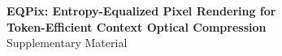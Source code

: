 \documentclass[10pt,twocolumn,letterpaper]{article}
\begin{document}








{
    \small
    
    
}



\clearpage
\onecolumn
\setcounter{page}{1}
\begin{center}
{\Large\textbf{EQPix: Entropy-Equalized Pixel Rendering for}}\\[0.2em]
{\Large\textbf{Token-Efficient Context Optical Compression}}\\[0.5em]
{\Large Supplementary Material}
\end{center}
\vspace{0.5em}
\makeatletter\renewcommand*{\Hy@backout}[1]{}\makeatother
\appendix

\end{document}
